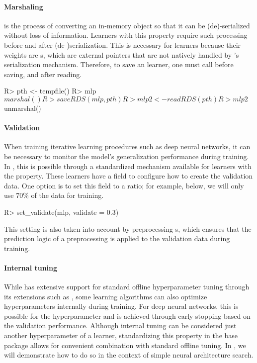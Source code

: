 \documentclass[article]{jss}
\theoremstyle{definition}
\begin{document}
\paragraph{Marshaling} is the process of converting an in-memory object so that it can be (de)-serialized without loss of information.
Learners with this property require such processing before and after (de-)serialization.
This is necessary for \torch{} learners because their weights are s, which are external pointers that are not natively handled by \rlang{}'s serialization mechanism.
Therefore, to save an \mlrttorch{} learner, one must call  before saving, and  after reading.

\begin{CodeInput}
R> pth <- tempfile()
R> mlp$marshal()
R> saveRDS(mlp, pth)
R> mlp2 <- readRDS(pth)
R> mlp2$unmarshal()
\end{CodeInput}

\paragraph{Validation}

When training iterative learning procedures such as deep neural networks, it can be necessary to monitor the model's generalization performance during training.
In \mlrt{}, this is possible through a standardized mechanism available for learners with the  property.
These learners have a  field to configure how to create the validation data.
One option is to set this field to a ratio; for example, below, we will only use $70\%$ of the data for training.

\begin{CodeInput}
R> set_validate(mlp, validate = 0.3)
\end{CodeInput}

This setting is also taken into account by preprocessing s, which ensures that the prediction logic of a preprocessing  is applied to the validation data during training.

\paragraph{Internal tuning}

While \mlrt{} has extensive support for standard offline hyperparameter tuning through its extensions such as  \citep{ref-mlr3tuning2024}, some learning algorithms can also optimize hyperparameters internally during training.
For deep neural networks, this is possible for the  hyperparameter and is achieved through early stopping based on the validation performance.
Although internal tuning can be considered just another hyperparameter of a learner, standardizing this property in the \mlrt{} base package allows for convenient combination with standard offline tuning.
In , we will demonstrate how to do so in the context of simple neural architecture search.
\end{document}
